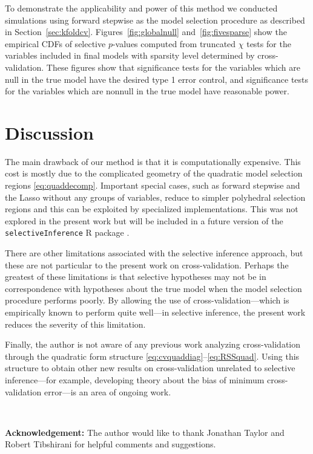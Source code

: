 \documentclass[preprint]{imsart}
\begin{document}
To demonstrate the applicability and power of this method we conducted
simulations using forward stepwise as the model selection procedure as
described in Section~\ref{sec:kfoldcv}. Figures~\ref{fig:globalnull}
and~\ref{fig:fivesparse} show the empirical CDFs of selective $p$-values
computed from truncated $\chi$ tests for the variables included in final
models with sparsity level determined by cross-validation. These figures
show that significance tests for the variables which are null in the true
model have the desired type 1 error control, and significance tests for
the variables which are nonnull in the true model have reasonable power.

\section{Discussion}

The main drawback of our method is that it is computationally expensive.
This cost is mostly due to the complicated geometry of the quadratic
model selection regions \eqref{eq:quaddecomp}. Important special cases,
such as forward stepwise and the Lasso without any groups of variables,
reduce to simpler polyhedral selection regions and this can be exploited
by specialized implementations. This was not explored in the present
work but will be included in a future version of the
\texttt{selectiveInference} R package \cite{SIR}.

There are other limitations associated with the selective inference
approach, but these are not particular to the present work on
cross-validation. Perhaps the greatest of these limitations is that
selective hypotheses may not be in correspondence with hypotheses
about the true model when the model selection procedure performs
poorly. By allowing the use of cross-validation---which is
empirically known to perform quite well---in selective inference,
the present work reduces the severity of this limitation.

Finally, the author is not aware of any previous work analyzing
cross-validation through the quadratic form structure
\eqref{eq:cvquaddiag}--\eqref{eq:RSSquad}. Using this structure to
obtain other new results on cross-validation unrelated to selective
inference---for example, developing theory about the bias of minimum
cross-validation error---is an area of ongoing work. 

\ 

\textbf{Acknowledgement:} The author would like to thank Jonathan Taylor and Robert Tibshirani for helpful comments and suggestions.
\end{document}
